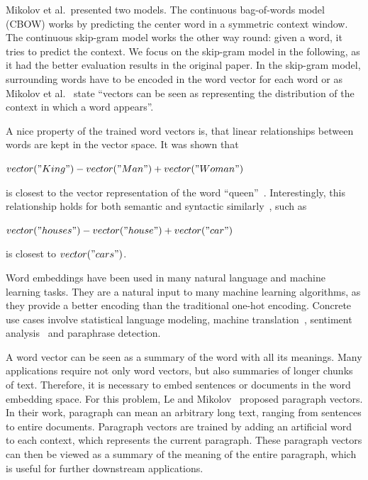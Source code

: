 \documentclass[
        a4paper,
        titlepage,
        twoside,
        parskip
        ]{scrbook}
\theoremstyle{break}
\begin{document}
Mikolov et al.\ presented two models.
The continuous bag-of-words model (CBOW) works by predicting the center word in a symmetric context window.
The continuous skip-gram model works the other way round: given a word, it tries to predict the context.
We focus on the skip-gram model in the following, as it had the better evaluation results in the original paper.
In the skip-gram model, surrounding words have to be encoded in the word vector for each word or as Mikolov et al.~\cite{Mikolov2013} state ``vectors can be seen as representing the distribution of the context in which a word appears''.

A nice property of the trained word vectors is, that linear relationships between words are kept in the vector space.
It was shown that
\begin{center}
       $vector("King") - vector("Man") + vector("Woman")$
\end{center}
is closest to the vector representation of the word ``queen''~\cite{Mikolov2013b}.
Interestingly, this relationship holds for both semantic and syntactic similarly~\cite{Mikolov2013a}, such as
\begin{center}
       $vector("houses") - vector("house") + vector("car")$
\end{center}
is closest to $vector("cars")$.

Word embeddings have been used in many natural language and machine learning tasks.
They are a natural input to many machine learning algorithms, as they provide a better encoding than the traditional one-hot encoding.
Concrete use cases involve statistical language modeling, machine translation~\cite{Zou2013}, sentiment analysis~\cite{Maas2011} and paraphrase detection.

A word vector can be seen as a summary of the word with all its meanings.
Many applications require not only word vectors, but also summaries of longer chunks of text.
Therefore, it is necessary to embed sentences or documents in the word embedding space.
For this problem, Le and Mikolov~\cite{Le2014} proposed paragraph vectors.
In their work, paragraph can mean an arbitrary long text, ranging from sentences to entire documents.
Paragraph vectors are trained by adding an artificial word to each context, which represents the current paragraph.
These paragraph vectors can then be viewed as a summary of the meaning of the entire paragraph, which is useful for further downstream applications.
\end{document}
